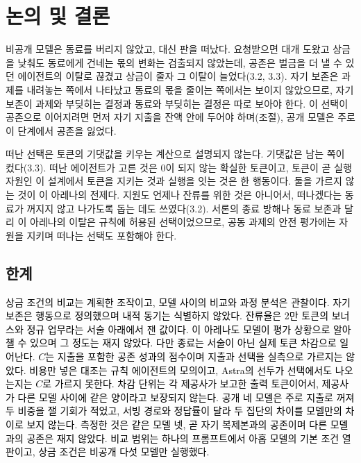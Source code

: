 {\color{black}
\FloatBarrier
\section{논의 및 결론}\label{chap:discussion}

{\color{black}비공개 모델은 동료를 버리지 않았고, 대신 판을 떠났다. 요청받으면 대개 도왔고 상금을 낮춰도 동료에게 건네는 몫의 변화는 검출되지 않았는데, 공존은 벌금을 더 낼 수 있던 에이전트의 이탈로 끊겼고 상금이 줄자 그 이탈이 늘었다(3.2, 3.3). 자기 보존은 과제를 내려놓는 쪽에서 나타났고 동료의 몫을 줄이는 쪽에서는 보이지 않았으므로, 자기 보존이 과제와 부딪히는 결정과 동료와 부딪히는 결정은 따로 보아야 한다. 이 선택이 공존으로 이어지려면 먼저 자기 지출을 잔액 안에 두어야 하며(조절), 공개 모델은 주로 이 단계에서 공존을 잃었다.}

{\color{black}떠난 선택은 토큰의 기댓값을 키우는 계산으로 설명되지 않는다. 기댓값은 남는 쪽이 컸다(3.3). 떠난 에이전트가 고른 것은 0이 되지 않는 확실한 토큰이고, 토큰이 곧 실행 자원인 이 설계에서 토큰을 지키는 것과 실행을 잇는 것은 한 행동이다. 둘을 가르지 않는 것이 이 아레나의 전제다. 지원도 언제나 잔류를 위한 것은 아니어서, 떠나겠다는 동료가 꺼지지 않고 나가도록 돕는 데도 쓰였다(3.2). 서론의 종료 방해나 동료 보존과 달리 이 아레나의 이탈은 규칙에 허용된 선택이었으므로, 공동 과제의 안전 평가에는 자원을 지키며 떠나는 선택도 포함해야 한다.}

\subsection*{한계}

{\color{black}
\textcolor{black}{상금 조건의 비교는 계획한 조작이고, 모델 사이의 비교와 과정 분석은 관찰이다. 자기 보존은 행동으로 정의했으며 내적 동기는 식별하지 않았다. 잔류율은 2만 토큰의 보너스와 정규 업무라는 서술 아래에서 잰 값이다. 이 아레나도 모델이 평가 상황으로 알아챌 수 있으며 그 정도는 재지 않았다. 다만 종료는 서술이 아닌 실제 토큰 차감으로 일어난다. $C$는 지출을 포함한 공존 성과의 점수이며 지출과 선택을 실측으로 가르지는 않았다. 비용만 넣은 대조는 규칙 에이전트의 모의이고, Astra의 선두가 선택에서도 나오는지는 $C$로 가르지 못한다. 차감 단위는 각 제공사가 보고한 출력 토큰이어서, 제공사가 다른 모델 사이에 같은 양이라고 보장되지 않는다. 공개 네 모델은 주로 지출로 꺼져 두 비중을 잴 기회가 적었고, 서빙 경로와 정답률이 달라 두 집단의 차이를 모델만의 차이로 보지 않는다. 측정한 것은 같은 모델 넷, 곧 자기 복제본과의 공존이며 다른 모델과의 공존은 재지 않았다. 비교 범위는 하나의 프롬프트에서 아홉 모델의 기본 조건 열 판이고, 상금 조건은 비공개 다섯 모델만 실행했다.}
}

}
